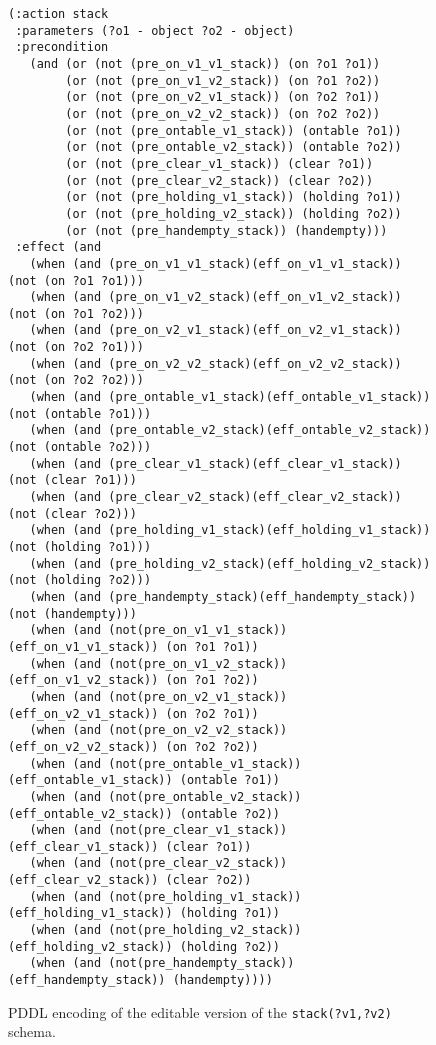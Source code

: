 \documentclass{article}
\begin{document}
\begin{figure}
  \begin{tiny}  
  \begin{verbatim}
(:action stack
 :parameters (?o1 - object ?o2 - object)
 :precondition
   (and (or (not (pre_on_v1_v1_stack)) (on ?o1 ?o1))
        (or (not (pre_on_v1_v2_stack)) (on ?o1 ?o2))
        (or (not (pre_on_v2_v1_stack)) (on ?o2 ?o1))
        (or (not (pre_on_v2_v2_stack)) (on ?o2 ?o2))
        (or (not (pre_ontable_v1_stack)) (ontable ?o1))
        (or (not (pre_ontable_v2_stack)) (ontable ?o2))
        (or (not (pre_clear_v1_stack)) (clear ?o1))
        (or (not (pre_clear_v2_stack)) (clear ?o2))
        (or (not (pre_holding_v1_stack)) (holding ?o1))
        (or (not (pre_holding_v2_stack)) (holding ?o2))
        (or (not (pre_handempty_stack)) (handempty)))
 :effect (and
   (when (and (pre_on_v1_v1_stack)(eff_on_v1_v1_stack)) (not (on ?o1 ?o1)))
   (when (and (pre_on_v1_v2_stack)(eff_on_v1_v2_stack)) (not (on ?o1 ?o2)))
   (when (and (pre_on_v2_v1_stack)(eff_on_v2_v1_stack)) (not (on ?o2 ?o1)))
   (when (and (pre_on_v2_v2_stack)(eff_on_v2_v2_stack)) (not (on ?o2 ?o2)))
   (when (and (pre_ontable_v1_stack)(eff_ontable_v1_stack)) (not (ontable ?o1)))
   (when (and (pre_ontable_v2_stack)(eff_ontable_v2_stack)) (not (ontable ?o2)))
   (when (and (pre_clear_v1_stack)(eff_clear_v1_stack)) (not (clear ?o1)))
   (when (and (pre_clear_v2_stack)(eff_clear_v2_stack)) (not (clear ?o2)))
   (when (and (pre_holding_v1_stack)(eff_holding_v1_stack)) (not (holding ?o1)))
   (when (and (pre_holding_v2_stack)(eff_holding_v2_stack)) (not (holding ?o2)))
   (when (and (pre_handempty_stack)(eff_handempty_stack)) (not (handempty)))
   (when (and (not(pre_on_v1_v1_stack))(eff_on_v1_v1_stack)) (on ?o1 ?o1))
   (when (and (not(pre_on_v1_v2_stack))(eff_on_v1_v2_stack)) (on ?o1 ?o2))
   (when (and (not(pre_on_v2_v1_stack))(eff_on_v2_v1_stack)) (on ?o2 ?o1))
   (when (and (not(pre_on_v2_v2_stack))(eff_on_v2_v2_stack)) (on ?o2 ?o2))
   (when (and (not(pre_ontable_v1_stack))(eff_ontable_v1_stack)) (ontable ?o1))
   (when (and (not(pre_ontable_v2_stack))(eff_ontable_v2_stack)) (ontable ?o2))
   (when (and (not(pre_clear_v1_stack))(eff_clear_v1_stack)) (clear ?o1))
   (when (and (not(pre_clear_v2_stack))(eff_clear_v2_stack)) (clear ?o2))
   (when (and (not(pre_holding_v1_stack))(eff_holding_v1_stack)) (holding ?o1))
   (when (and (not(pre_holding_v2_stack))(eff_holding_v2_stack)) (holding ?o2))
   (when (and (not(pre_handempty_stack))(eff_handempty_stack)) (handempty))))
  \end{verbatim}           
  \end{tiny}  
 \caption{\small PDDL encoding of the editable version of the {\tt\small stack(?v1,?v2)} schema.}
\label{fig:editable}
\end{figure}
\end{document}
